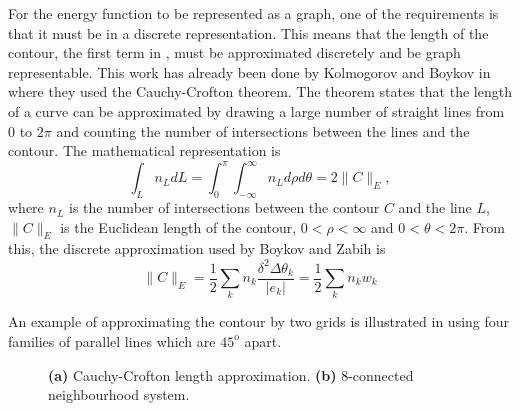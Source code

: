 \begin{definition}
	For the energy function to be represented as a graph, one of the requirements is that it must be in a discrete representation. This means that the length of the contour, the first term in , must be approximated discretely and be graph representable. This work has already been done by Kolmogorov and Boykov in \citep{Kolmogorov2005_2,Boykov2003} where they used the Cauchy-Crofton theorem. The theorem states that the length of a curve can be approximated by drawing a large number of straight lines from $0$ to $2\pi$ and counting the number of intersections between the lines and the contour. The mathematical representation is
	\begin{equation}
		\int_L n_L dL = \int_{0}^{\pi}\int_{-\infty}^{\infty} n_L d\rho d\theta = 2 \lVert C \rVert_E,
	\end{equation}
	where $n_L$ is the number of intersections between the contour $C$ and the line $L$, $ \lVert C \rVert_E$ is the Euclidean length of the contour, $0 < \rho < \infty$ and $0 < \theta < 2\pi$. From this, the discrete approximation used by Boykov and Zabih is 
	\begin{equation}
		\lVert C \rVert_E = \frac{1}{2}\sum_k n_k \frac{\delta^2 \Delta\theta_k}{|e_k|} = \frac{1}{2}\sum_k n_k w_k
		\label{eq:discretelength}
	\end{equation}
\end{definition}
An example of approximating the contour by two grids is illustrated in  using four families of parallel lines which are $45^\text{o}$ apart.

\begin{figure}[!t]
	\centering
	\caption{\textbf{(a)} Cauchy-Crofton length approximation. \textbf{(b)} 8-connected neighbourhood system.}
	\label{fig:chanveseN8}
\end{figure}

